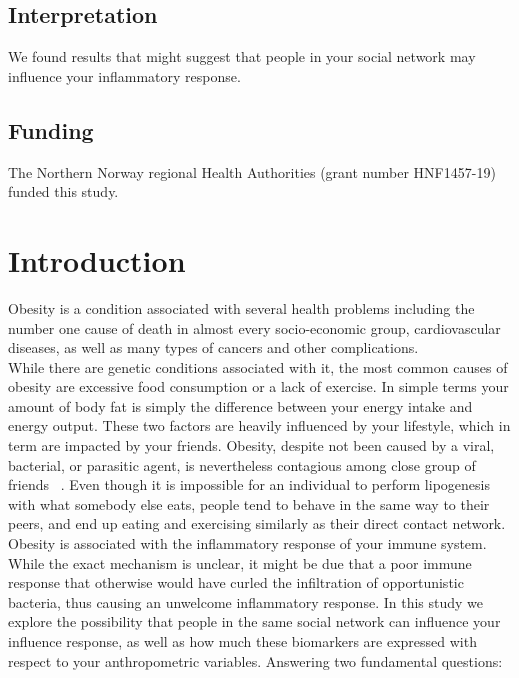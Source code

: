 \documentclass[10pt, a4paper, onecolumn]{article} %
\begin{document}
\subsection{Interpretation}

We found results that might suggest that people in your social network may influence your inflammatory response.\\

\subsection{Funding}

The Northern Norway regional Health Authorities (grant number HNF1457-19) funded this study.\\


 
\section{Introduction}

Obesity is a condition associated with several health problems including the number one cause of death in almost every socio-economic group, cardiovascular diseases, as well as many types of cancers and other complications.\\

While there are genetic conditions associated with it, the most common causes of obesity are excessive food consumption or a lack of exercise. In simple terms your amount of body fat is simply the difference between your energy intake and energy output. These two factors are heavily influenced by your lifestyle, which in term are impacted by your friends. Obesity, despite not been caused by a viral, bacterial, or parasitic agent, is nevertheless contagious among close group of friends ~\cite{ref:MainObesityArticle}. Even though it is impossible for an individual to perform lipogenesis with what somebody else eats, people tend to behave in the same way to their peers, and end up eating and exercising similarly as their direct contact network.\\

Obesity is associated with the inflammatory response of your immune system. While the exact mechanism is unclear, it might be due that a poor immune response that otherwise would have curled the infiltration of opportunistic bacteria, thus causing an unwelcome inflammatory response. In this study we explore the possibility that people in the same social network can influence your influence response, as well as how much these biomarkers are expressed with respect to your anthropometric variables. Answering two fundamental questions:\\
\end{document}
